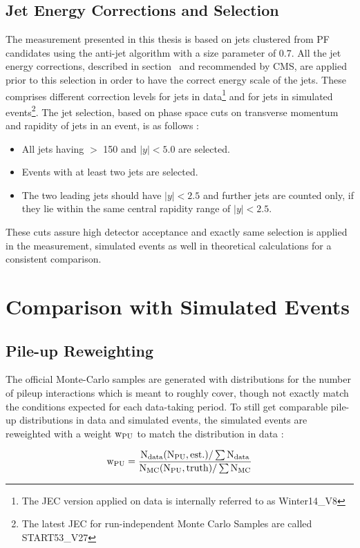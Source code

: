 \subsection{Jet Energy Corrections and Selection}
The measurement presented in this thesis is based on jets clustered from PF candidates using the anti-\kt jet algorithm with a size parameter of 0.7. All the jet energy corrections, described in section \qm~and recommended by CMS, are applied prior to this selection in order to have the correct energy scale of the jets. These comprises different correction levels for jets in data\footnote{The JEC version applied on data is internally referred to as Winter14\_V8} and for jets in simulated events\footnote{The latest JEC for run-independent Monte Carlo Samples are called START53\_V27}. The jet selection, based on phase space cuts on transverse momentum and rapidity of jets in an event, is as follows : 

\begin{itemize}
\item All jets having \pt $>$ 150 \GeV and $|y| < 5.0$ are selected.
\item Events with at least two jets are selected.
\item The two leading jets should have $|y| < 2.5$ and further jets are counted only, if they lie within the same central rapidity range of $|y| < 2.5$. 
\end{itemize}
These cuts assure high detector acceptance and exactly same selection is applied in the measurement, simulated events as well in theoretical calculations for a consistent comparison. 

\section{Comparison with Simulated Events}
\subsection{Pile-up Reweighting}
The official Monte-Carlo samples are generated with distributions for the number of pileup interactions which is meant to roughly cover, 
though not exactly match the conditions expected for each data-taking period. To still get comparable pile-up distributions in data and 
simulated events, the simulated events are reweighted with a weight $\rm{ w_{PU}}$ to match the distribution in data :

\begin{equation}
  \rm{w_{PU} = \frac {N_{data} (N_{PU},est.)/\sum N_{data}} {N_{MC} (N_{PU},truth)/\sum N_{MC}}}
\end{equation}

